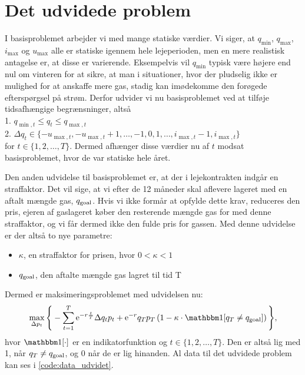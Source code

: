 \section{Det udvidede problem} \label{kap:udvidet_problem}

I basisproblemet arbejder vi med mange statiske værdier. Vi siger, at $q_{\min}$, $q_{\max}$, $i_{\max}$ og $u_{\max}$ alle er statiske igennem hele lejeperioden, men en mere realistisk antagelse er, at disse er varierende. Eksempelvis vil $q_{\min}$ typisk være højere end nul om vinteren for at sikre, at man i situationer, hvor der pludselig ikke er mulighed for at anskaffe mere gas, stadig kan imødekomme den forøgede efterspørgsel på strøm. Derfor udvider vi nu basisproblemet ved at tilføje tidsafhængige begrænsninger, altså\\
1. $q_{\min,t} \leq q_{t} \leq q_{\max,t}$ \\
2. $\Delta q_{t} \in \{-u_{\max,t}, -u_{\max,t} + 1, \dotsc, -1, 0, 1, \dotsc, i_{\max,t} -1, i_{\max,t} \}$ \\
for $t \in \{1,2,\dotsc,T \}$. Dermed afhænger disse værdier nu af $t$ modsat basisproblemet, hvor de var statiske hele året. 

Den anden udvidelse til basisproblemet er, at der i lejekontrakten indgår en straffaktor. Det vil sige, at vi efter de 12 måneder skal aflevere lageret med en aftalt mængde gas, $q_{\textrm{goal}}$. Hvis vi ikke formår at opfylde dette krav, reduceres den pris, ejeren af gaslageret køber den resterende mængde gas for med denne straffaktor, og vi får dermed ikke den fulde pris for gassen. Med denne udvidelse er der altså to nye parametre:
\begin{itemize}
\item $\kappa$, en straffaktor for prisen, hvor $0 < \kappa < 1$
\item $q_{\textrm{goal}}$, den aftalte mængde gas lagret til tid T
\end{itemize}
Dermed er maksimeringsproblemet med udvidelsen nu:
\begin{equation}
\max_{\Delta p_{t}} \Bigg\{ -\sum_{t=1}^{T} \mathrm{e}^{-r\frac{t}{T}} \Delta q_{t} p_{t}+ \mathrm{e}^{-r}q_{T}p_{T} \left (1- \kappa \cdot \ind [q_{T} \neq q_{\goal}] \right )  \Bigg\}, 
\end{equation}
hvor $\ind [\cdot]$ er en indikatorfunktion og $t \in \{1,2,\dotsc,T \}$. Den er altså lig med 1, når $q_{T} \neq q_{\textrm{goal}}$, og 0 når de er lig hinanden. Al data til det udvidede problem kan ses i \autoref{code:data_udvidet}.